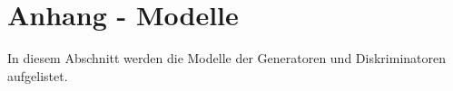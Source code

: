 \chapter{Anhang - Modelle}
In diesem Abschnitt werden die Modelle der Generatoren und Diskriminatoren aufgelistet.


\newpage

\newpage

\newpage

\newpage


\cleardoublepage